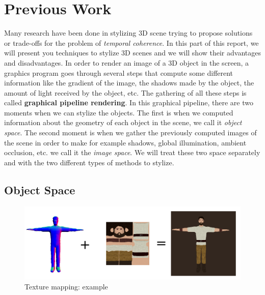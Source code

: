 \chapter{Previous Work}

Many research have been done in stylizing 3D scene\cite{schmid_overcoat:_2011, praun_real-time_2001, klein_non-photorealistic_2000, benard_dynamic_2009, benard_dynamic_2010, freudenberg_walk-through_2001, benard_state---art_2011} trying to propose solutions or trade-offs for the problem of \textit{temporal coherence}. In this part of this report, we will present you techniques to stylize 3D scenes and we will show their advantages and disadvantages. In order to render an image of a 3D object in the screen, a graphics program goes through several steps that compute some different information like the gradient of the image, the shadows made by the object, the amount of light received by the object, etc. The gathering of all these steps is called \textbf{graphical pipeline rendering}. In this graphical pipeline, there are two moments when we can stylize the objects. The first is when we computed information about the geometry of each object in the scene, we call it \textit{object space}. The second moment is when we gather the previously computed images of the scene in order to make for example shadows, global illumination, ambient occlusion, etc. we call it the \textit{image space}. We will treat these two space separately and with the two different types of methods to stylize.



\section{Object Space}


\begin{figure}
    \begin{center}
    \includegraphics[scale=0.2]{pics/texture_mapping.png}
    \end{center}
    \caption{Texture mapping: example}
    \label{texture_mapping}
\end{figure}

